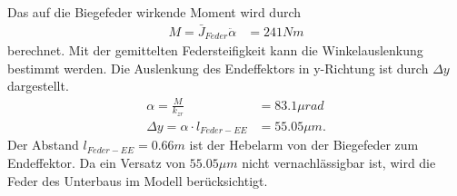 \documentclass[10pt,a4paper]{iace.report}
\begin{document}
					Das auf die Biegefeder wirkende Moment wird durch	
					\begin{align*}	
						M = \bar{J}_{Feder}\ddot{\alpha} &= 241Nm
					\end{align*}
					berechnet. Mit der gemittelten Federsteifigkeit kann die Winkelauslenkung bestimmt werden. Die Auslenkung des Endeffektors in y-Richtung ist durch $\Delta y$ dargestellt. 
					\begin{align*}	
						\alpha = \frac{M}{k_{zr}} &= 83.1 \mu rad\\ 
						\Delta y = \alpha\cdot l_{Feder-EE} &= 55.05 \mu m.
					\end{align*}
					Der Abstand $ l_{Feder-EE}=0.66m $ ist der Hebelarm von der Biegefeder zum Endeffektor. Da ein Versatz von $ 55.05 \mu m $ nicht vernachlässigbar ist, wird die Feder des Unterbaus im Modell berücksichtigt.
					
\end{document}
